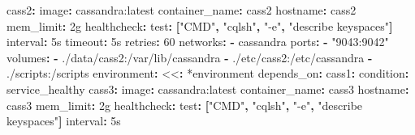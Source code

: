 \documentclass[
]{book}
\newenvironment{Shaded}{}{}
\newcommand{\AttributeTok}[1]{\textcolor[rgb]{0.49,0.56,0.16}{#1}}
\newcommand{\DecValTok}[1]{\textcolor[rgb]{0.25,0.63,0.44}{#1}}
\newcommand{\FunctionTok}[1]{\textcolor[rgb]{0.02,0.16,0.49}{#1}}
\newcommand{\KeywordTok}[1]{\textcolor[rgb]{0.00,0.44,0.13}{\textbf{#1}}}
\newcommand{\OtherTok}[1]{\textcolor[rgb]{0.00,0.44,0.13}{#1}}
\newcommand{\StringTok}[1]{\textcolor[rgb]{0.25,0.44,0.63}{#1}}
\begin{document}
\begin{Shaded}
\begin{Highlighting}[]
\AttributeTok{  }\FunctionTok{cass2}\KeywordTok{:}
\AttributeTok{    }\FunctionTok{image}\KeywordTok{:}\AttributeTok{ cassandra:latest}
\AttributeTok{    }\FunctionTok{container\_name}\KeywordTok{:}\AttributeTok{ cass2}
\AttributeTok{    }\FunctionTok{hostname}\KeywordTok{:}\AttributeTok{ cass2}
\AttributeTok{    }\FunctionTok{mem\_limit}\KeywordTok{:}\AttributeTok{ 2g}
\AttributeTok{    }\FunctionTok{healthcheck}\KeywordTok{:}
\AttributeTok{      }\FunctionTok{test}\KeywordTok{:}\AttributeTok{ }\KeywordTok{[}\StringTok{"CMD"}\KeywordTok{,}\AttributeTok{ }\StringTok{"cqlsh"}\KeywordTok{,}\AttributeTok{ }\StringTok{"{-}e"}\KeywordTok{,}\AttributeTok{ }\StringTok{"describe keyspaces"}\KeywordTok{]}
\AttributeTok{      }\FunctionTok{interval}\KeywordTok{:}\AttributeTok{ 5s}
\AttributeTok{      }\FunctionTok{timeout}\KeywordTok{:}\AttributeTok{ 5s}
\AttributeTok{      }\FunctionTok{retries}\KeywordTok{:}\AttributeTok{ }\DecValTok{60}
\AttributeTok{    }\FunctionTok{networks}\KeywordTok{:}
\AttributeTok{      }\KeywordTok{{-}}\AttributeTok{ cassandra}
\AttributeTok{    }\FunctionTok{ports}\KeywordTok{:}
\AttributeTok{      }\KeywordTok{{-}}\AttributeTok{ }\StringTok{"9043:9042"}
\AttributeTok{    }\FunctionTok{volumes}\KeywordTok{:}
\AttributeTok{      }\KeywordTok{{-}}\AttributeTok{ ./data/cass2:/var/lib/cassandra}
\AttributeTok{      }\KeywordTok{{-}}\AttributeTok{ ./etc/cass2:/etc/cassandra}
\AttributeTok{      }\KeywordTok{{-}}\AttributeTok{ ./scripts:/scripts}
\AttributeTok{    }\FunctionTok{environment}\KeywordTok{:}
\AttributeTok{      }\FunctionTok{\textless{}\textless{}}\KeywordTok{:}\AttributeTok{ }\OtherTok{*environment}
\AttributeTok{    }\FunctionTok{depends\_on}\KeywordTok{:}
\AttributeTok{      }\FunctionTok{cass1}\KeywordTok{:}
\AttributeTok{        }\FunctionTok{condition}\KeywordTok{:}\AttributeTok{ service\_healthy}
\AttributeTok{  }\FunctionTok{cass3}\KeywordTok{:}
\AttributeTok{    }\FunctionTok{image}\KeywordTok{:}\AttributeTok{ cassandra:latest}
\AttributeTok{    }\FunctionTok{container\_name}\KeywordTok{:}\AttributeTok{ cass3}
\AttributeTok{    }\FunctionTok{hostname}\KeywordTok{:}\AttributeTok{ cass3}
\AttributeTok{    }\FunctionTok{mem\_limit}\KeywordTok{:}\AttributeTok{ 2g}
\AttributeTok{    }\FunctionTok{healthcheck}\KeywordTok{:}
\AttributeTok{      }\FunctionTok{test}\KeywordTok{:}\AttributeTok{ }\KeywordTok{[}\StringTok{"CMD"}\KeywordTok{,}\AttributeTok{ }\StringTok{"cqlsh"}\KeywordTok{,}\AttributeTok{ }\StringTok{"{-}e"}\KeywordTok{,}\AttributeTok{ }\StringTok{"describe keyspaces"}\KeywordTok{]}
\AttributeTok{      }\FunctionTok{interval}\KeywordTok{:}\AttributeTok{ 5s}

\end{Highlighting}
\end{Shaded}
\end{document}
